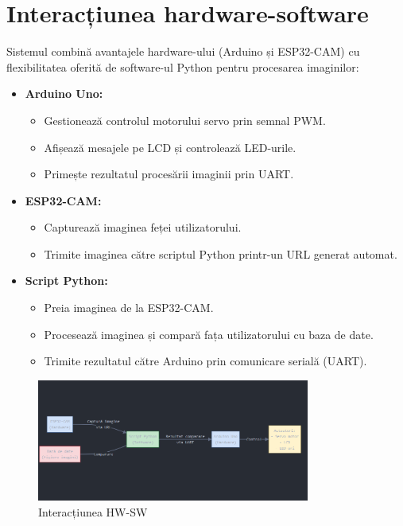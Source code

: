 \documentclass{report}
\begin{document}
\section{Interacțiunea hardware-software}
Sistemul combină avantajele hardware-ului (Arduino și ESP32-CAM) cu flexibilitatea oferită de software-ul Python pentru procesarea imaginilor:
\begin{itemize}
    \item \textbf{Arduino Uno:}
    \begin{itemize}
        \item Gestionează controlul motorului servo prin semnal PWM.
        \item Afișează mesajele pe LCD și controlează LED-urile.
        \item Primește rezultatul procesării imaginii prin UART.
    \end{itemize}
    \item \textbf{ESP32-CAM:}
    \begin{itemize}
        \item Capturează imaginea feței utilizatorului.
        \item Trimite imaginea către scriptul Python printr-un URL generat automat.
    \end{itemize}
    \newpage
    \vspace*{1cm}
    \item \textbf{Script Python:}
    \begin{itemize}
        \item Preia imaginea de la ESP32-CAM.
        \item Procesează imaginea și compară fața utilizatorului cu baza de date.
        \item Trimite rezultatul către Arduino prin comunicare serială (UART).
    \end{itemize}
\end{itemize}
\begin{figure}[H]
    \centering
    \includegraphics[width=0.8\textwidth]{Schema hardware-software.png}
    \caption{Interacțiunea HW-SW}
    \label{fig:schemahw-sw}
\end{figure}
\end{document}

